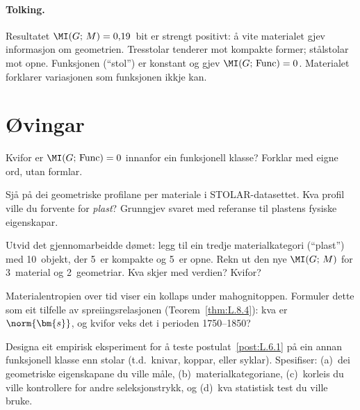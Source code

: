 \paragraph{Tolking.}
Resultatet $\MI(G;\, M) = 0{,}19$~bit er strengt positivt: å vite
materialet gjev informasjon om geometrien. Tresstolar tenderer mot
kompakte former; stålstolar mot opne. Funksjonen (``stol'') er
konstant og gjev $\MI(G;\, \mathrm{Func}) = 0$. Materialet
forklarer variasjonen som funksjonen ikkje kan.


\section{Øvingar}

\begin{exercise}[Nivå 1]\label{ex:8.1}
Kvifor er $\MI(G;\, \mathrm{Func}) = 0$ innanfor ein funksjonell
klasse? Forklar med eigne ord, utan formlar.
\end{exercise}

\begin{exercise}[Nivå 1]\label{ex:8.2}
Sjå på dei geometriske profilane per materiale i
STOLAR-datasettet. Kva profil ville du forvente for \emph{plast}?
Grunngjev svaret med referanse til plastens fysiske eigenskapar.
\end{exercise}

\begin{exercise}[Nivå 2]\label{ex:8.3}
Utvid det gjennomarbeidde dømet: legg til ein tredje material\-kategori
(``plast'') med 10~objekt, der 5~er kompakte og 5~er opne. Rekn
ut den nye $\MI(G;\, M)$ for 3~material og 2~geometriar. Kva
skjer med verdien? Kvifor?
\end{exercise}

\begin{exercise}[Nivå 2]\label{ex:8.4}
Materialentropien over tid viser ein kollaps under mahognitoppen.
Formuler dette som eit tilfelle av spreiingsrelasjonen
(Teorem~\ref{thm:L.8.4}): kva er $\norm{\bm{s}}$, og kvifor
veks det i perioden 1750--1850?
\end{exercise}

\begin{exercise}[Nivå 3]\label{ex:8.5}
Designa eit empirisk eksperiment for å teste postulat~\ref{post:L.6.1}
på ein annan funksjonell klasse enn stolar (t.d.\ knivar, koppar,
eller syklar). Spesifiser: (a)~dei geometriske eigenskapane du
ville måle, (b)~materialkategoriane, (c)~korleis du ville
kontrollere for andre seleksjonstrykk, og (d)~kva statistisk test
du ville bruke.
\end{exercise}

